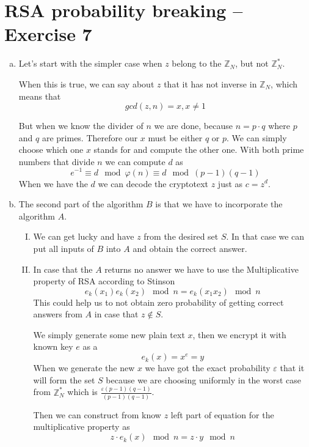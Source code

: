 \documentclass[a4paper,10pt]{article}
\begin{document}
\section*{RSA probability breaking -- Exercise 7}
\begin{enumerate}[a)]
\item 
Let's start with the simpler case when $z$ belong to the $\mathds{Z}_N$, but not $\mathds{Z}_N^*$.

When this is true, we can say about $z$ that it has not inverse in $\mathds{Z}_N$, which means that
$$
gcd(z, n) = x, x \neq 1
$$

But when we know the divider of $n$ we are done, because
$n = p\cdot q$
where $p$ and $q$ are primes. Therefore our $x$ must be either $q$ or $p$. We can simply choose which one $x$ stands for and compute the other one. With both prime numbers that divide $n$ we can compute $d$ as
$$
e^{-1} \equiv d \mod \varphi(n) \equiv d \mod (p-1)(q-1)
$$
When we have the $d$ we can decode the cryptotext $z$ just as $c = z^d$.

\item 
The second part of the algorithm $B$ is that we have to incorporate the algorithm $A$.
\begin{enumerate}[I)]
\item We can get lucky and have $z$ from the desired set $S$. In that case we can put all inputs of $B$ into $A$ and obtain the correct answer. 
\item 

In case that the $A$ returns no answer we have to use the Multiplicative property of RSA according to Stinson
$$
e_k(x_1)e_k(x_2) \mod n = e_k(x_1x_2) \mod n
$$
This could help us to not obtain zero probability of getting correct answers from $A$ in case that $z \notin S$.
%

We simply generate some new plain text $x$, then we encrypt it with known key $e$ as a
$$
e_k(x) = x^e = y
$$
When we generate the new $x$ we have got the exact probability $\varepsilon$ that it will form the set $S$ because we are choosing uniformly in the worst case from $\mathds{Z}_N^*$ which is $\frac{\varepsilon(p-1)(q-1)}{(p-1)(q-1)}$.

Then we can construct from know $z$ left part of equation for the multiplicative property as $$
z\cdot e_k(x) \mod n = z\cdot y \mod n
$$


\end{enumerate}
\end{enumerate}
\end{document}
